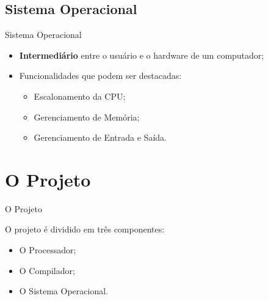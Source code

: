 \documentclass[aspectratio=169]{beamer}
\begin{document}
	\subsection{Sistema Operacional}
	\begin{frame}{Sistema Operacional}	
		\begin{itemize}
			
			
			\item \textbf{Intermediário} entre o usuário e o hardware de um computador;
			
			\vspace{0.5cm}
			
			\item Funcionalidades que podem ser destacadas:
			
			\begin{itemize}
				\item Escalonamento da CPU;
				
				\vspace{0.2cm}
				
				\item Gerenciamento de Memória;
				
				\vspace{0.2cm}
				
				\item Gerenciamento de Entrada e Saída. 
			\end{itemize}
					
		\end{itemize}

	\end{frame}
	
	
	\section{O Projeto}
	\begin{frame}{O Projeto}
		
		O projeto é dividido em três componentes:
		\begin{itemize}
			\item O Processador;
			
			\vspace{0.2cm}
			
			\item O Compilador;
			
			\vspace{0.2cm}
			
			\item O Sistema Operacional.
		\end{itemize}
	
	\end{frame}
\end{document}
